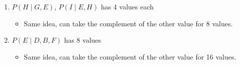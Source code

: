 \begin{example}
\begin{enumerate}
\begin{enumerate}
\begin{itemize}
            \end{itemize}
            \item $P(H \mid G,E)$, $P(I \mid E,H)$ has 4 values each
            \begin{itemize}
                \item Same idea, can take the complement of the other value for 8 values.
            \end{itemize}
            \item $P(E \mid D,B,F)$ has 8 values 
            \begin{itemize}
                \item Same idea, can take the complement of the other value for 16 values.
            \end{itemize}
        \end{enumerate}
    \end{enumerate}
\end{example}

